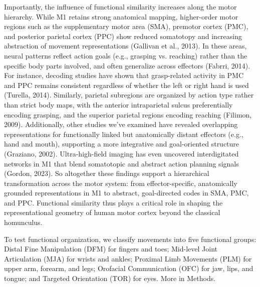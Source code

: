 \documentclass{article}
\begin{document}
Importantly, the influence of functional similarity increases along the motor hierarchy. While M1 retains strong anatomical mapping, higher-order motor regions such as the supplementary motor area (SMA), premotor cortex (PMC), and posterior parietal cortex (PPC) show reduced somatotopy and increasing abstraction of movement representations (Gallivan et al., 2013). In these areas, neural patterns reflect action goals (e.g., grasping vs. reaching) rather than the specific body parts involved, and often generalize across effectors (Fabrri, 2014). For instance, decoding studies have shown that grasp-related activity in PMC and PPC remains consistent regardless of whether the left or right hand is used (Turella, 2014). Similarly, parietal subregions are organized by action type rather than strict body maps, with the anterior intraparietal sulcus preferentially encoding grasping, and the superior parietal regions encoding reaching (Filimon, 2009). Additionally, other studies we've examined have revealed overlapping representations for functionally linked but anatomically distant effectors (e.g., hand and mouth), supporting a more integrative and goal-oriented structure (Graziano, 2002). Ultra-high-field imaging has even uncovered interdigitated networks in M1 that blend somatotopic and abstract action planning signals (Gordon, 2023). So altogether these findings support a hierarchical transformation across the motor system: from effector-specific, anatomically grounded representations in M1 to abstract, goal-directed codes in SMA, PMC, and PPC. Functional similarity thus plays a critical role in shaping the representational geometry of human motor cortex beyond the classical homunculus.

To test functional organization, we classify movements into five functional groups: Distal Fine Manipulation (DFM) for fingers and toes; Mid-level Joint Articulation (MJA) for wrists and ankles; Proximal Limb Movements (PLM) for upper arm, forearm, and legs; Orofacial Communication (OFC) for jaw, lips, and tongue; and Targeted Orientation (TOR) for eyes. More in Methods.



\end{document}
